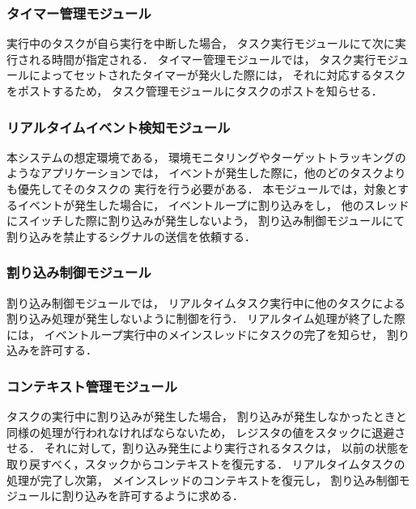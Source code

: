 \subsubsection{タイマー管理モジュール}

\vspace{0.5em}実行中のタスクが自ら実行を中断した場合，
タスク実行モジュールにて次に実行される時間が指定される．
タイマー管理モジュールでは，
タスク実行モジュールによってセットされたタイマーが発火した際には，
それに対応するタスクをポストするため，
タスク管理モジュールにタスクのポストを知らせる．


\subsubsection{リアルタイムイベント検知モジュール}

\vspace{0.5em}本システムの想定環境である，
環境モニタリングやターゲットトラッキングのようなアプリケーションでは，
イベントが発生した際に，他のどのタスクよりも優先してそのタスクの
実行を行う必要がある．
本モジュールでは，対象とするイベントが発生した場合に，
イベントループに割り込みをし，
他のスレッドにスイッチした際に割り込みが発生しないよう，
割り込み制御モジュールにて割り込みを禁止するシグナルの送信を依頼する．


\subsubsection{割り込み制御モジュール}

\vspace{0.5em}割り込み制御モジュールでは，
リアルタイムタスク実行中に他のタスクによる
割り込み処理が発生しないように制御を行う．
リアルタイム処理が終了した際には，
イベントループ実行中のメインスレッドにタスクの完了を知らせ，
割り込みを許可する．


\subsubsection{コンテキスト管理モジュール}

\vspace{0.5em}タスクの実行中に割り込みが発生した場合，
割り込みが発生しなかったときと同様の処理が行われなければならないため，
レジスタの値をスタックに退避させる．
それに対して，割り込み発生により実行されるタスクは，
以前の状態を取り戻すべく，スタックからコンテキストを復元する．
リアルタイムタスクの処理が完了し次第，
メインスレッドのコンテキストを復元し，
割り込み制御モジュールに割り込みを許可するように求める．




